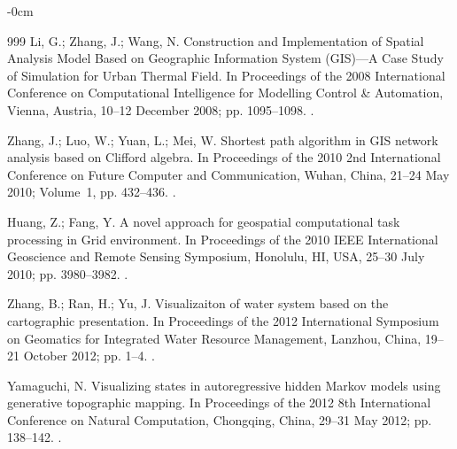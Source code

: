 \documentclass[technologies,article,accept,pdftex,moreauthors]{Definitions/mdpi}
\begin{document}
\begin{adjustwidth}{-\extralength}{0cm}
\begin{thebibliography}{999}
	Li, G.; Zhang, J.; Wang, N.
	\newblock Construction and Implementation of Spatial Analysis Model Based on
	Geographic Information System (GIS)---A Case Study of Simulation for Urban
	Thermal Field.
	\newblock In Proceedings of the 2008 International Conference on Computational
	Intelligence for Modelling Control \& Automation, Vienna, Austria, 10--12 December 2008; pp. 1095--1098. %
	.
	
	Zhang, J.; Luo, W.; Yuan, L.; Mei, W.
	\newblock Shortest path algorithm in GIS network analysis based on Clifford
	algebra.
	\newblock In Proceedings of the 2010 2nd International Conference on Future
	Computer and Communication, Wuhan, China, 21--24 May 2010; Volume~1, pp. 432--436. %
	.
	
	Huang, Z.; Fang, Y.
	\newblock A novel approach for geospatial computational task processing in Grid
	environment.
	\newblock In Proceedings of the 2010 IEEE International Geoscience and Remote
	Sensing Symposium, Honolulu, HI, USA, 25--30 July 2010; pp. 3980--3982. %
	.
	
	
	Zhang, B.; Ran, H.; Yu, J.
	\newblock Visualizaiton of water system based on the cartographic presentation.
	\newblock In Proceedings of the 2012 International Symposium on Geomatics for
	Integrated Water Resource Management, Lanzhou, China, 19--21 October 2012; pp. 1--4. %
	.
	
	Yamaguchi, N.
	\newblock Visualizing states in autoregressive hidden Markov models using
	generative topographic mapping.
	\newblock In Proceedings of the 2012 8th International Conference on Natural
	Computation, Chongqing, China, 29--31 May 2012; pp. 138--142. %
	.
	

\end{thebibliography}
\end{adjustwidth}
\end{document}
